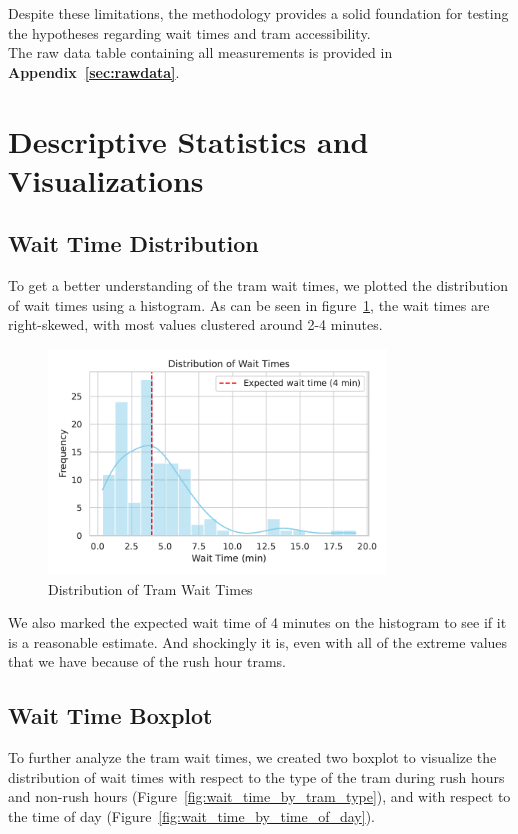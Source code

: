 \documentclass[a4paper, 10pt]{article}
\begin{document}
				\noindent Despite these limitations, the methodology provides a solid foundation for testing the hypotheses regarding wait times and tram accessibility. \\

				\noindent The raw data table containing all measurements is provided in \textbf{Appendix~\ref{sec:rawdata}}.

	\newpage
	\section{Descriptive Statistics and Visualizations}
		\subsection{Wait Time Distribution}
				To get a better understanding of the tram wait times,
				we plotted the distribution of wait times using a histogram. As can be seen in figure~\ref{fig:wait_time_distribution},
				the wait times are right-skewed, with most values clustered around 2-4 minutes.

				\begin{figure}[h!]
					\centering
					\includegraphics[width=0.8\textwidth]{Plot_DistributionOfWaitTimes.pdf}
					\caption{Distribution of Tram Wait Times}
					\label{fig:wait_time_distribution}
				\end{figure}

				\noindent We also marked the expected wait time of 4 minutes on the histogram to see if it is a reasonable estimate.
				And shockingly it is, even with all of the extreme values that we have because of the rush hour trams. \\
			
		\subsection{Wait Time Boxplot}
				To further analyze the tram wait times, we created two boxplot to visualize the distribution of wait times with respect
				to the type of the tram during rush hours and non-rush hours (Figure~\ref{fig:wait_time_by_tram_type}), 
				and with respect to the time of day (Figure~\ref{fig:wait_time_by_time_of_day}). \\
\end{document}
